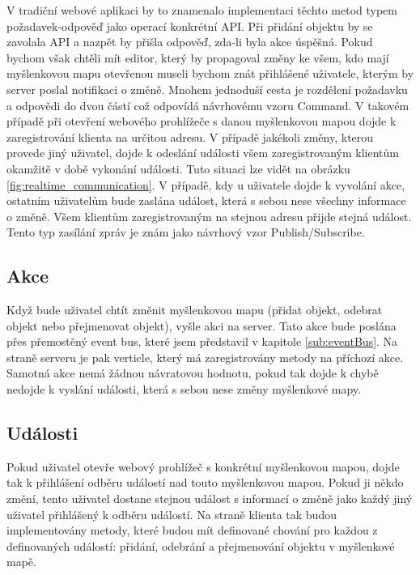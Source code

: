 V tradiční webové aplikaci by to znamenalo implementaci těchto metod typem požadavek-odpověď jako operací konkrétní API. Při přidání objektu by se zavolala API a nazpět by přišla odpověď, zda-li byla akce úspěšná. Pokud bychom však chtěli mít editor, který by propagoval změny ke všem, kdo mají myšlenkovou mapu otevřenou museli bychom znát přihlášené uživatele, kterým by server poslal notifikaci o změně. Mnohem jednoduší cesta je rozdělení požadavku a odpovědi do dvou částí což odpovídá návrhovému vzoru Command. V takovém případě při otevření webového prohlížeče s danou myšlenkovou mapou dojde k zaregistrování klienta na určitou adresu. V případě jakékoli změny, kterou provede jiný uživatel, dojde k odeslání události všem zaregistrovaným klientům okamžitě v době vykonání události. Tuto situaci lze vidět na obrázku \ref{fig:realtime_communication}. V případě, kdy u uživatele dojde k vyvolání akce, ostatním uživatelům bude zaslána událost, která s sebou nese všechny informace o změně. Všem klientům zaregistrovaným na stejnou adresu přijde stejná událost. Tento typ zasílání zpráv je znám jako návrhový vzor Publish/Subscribe.

\subsection{Akce}

Když bude uživatel chtít změnit myšlenkovou mapu (přidat objekt, odebrat objekt nebo přejmenovat objekt), vyšle akci na server. Tato akce bude poslána přes přemostěný event bus, které jsem představil v kapitole \ref{sub:eventBus}. Na straně serveru je pak verticle, který má zaregistrovány metody na příchozí akce. Samotná akce nemá žádnou návratovou hodnotu, pokud tak dojde k chybě nedojde k vyslání události, která s sebou nese změny myšlenkové mapy.

\subsection{Události}

Pokud uživatel otevře webový prohlížeč s konkrétní myšlenkovou mapou, dojde tak k přihlášení odběru událostí nad touto myšlenkovou mapou. Pokud ji někdo změní, tento uživatel dostane stejnou událost s informací o změně jako každý jiný uživatel přihlášený k odběru událostí.
Na straně klienta tak budou implementovány metody, které budou mít definované chování pro každou z definovaných událostí: přidání, odebrání a přejmenování objektu v myšlenkové mapě.

